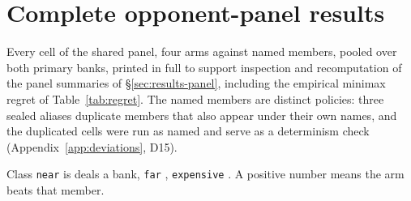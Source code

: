 \section{Complete opponent-panel results}
\label{app:panel}

Every cell of the shared panel, four arms against \vsevenPanelMembers{} named members, pooled over
both primary banks, printed in full to support inspection and recomputation of the panel summaries
of \S\ref{sec:results-panel}, including the empirical minimax regret of Table~\ref{tab:regret}. The
\vsevenPanelMembers{} named members are \vsevenPanelDistinct{} distinct policies: three sealed
aliases duplicate members that also appear under their own names, and the duplicated cells were run
as named and serve as a determinism check (Appendix~\ref{app:deviations}, D15).

Class \texttt{near} is \vsevenDealsNear{} deals a bank, \texttt{far} \vsevenDealsFar{},
\texttt{expensive} \vsevenDealsExpensive{}. A
positive number means the arm beats that member.

{\tabfont}

